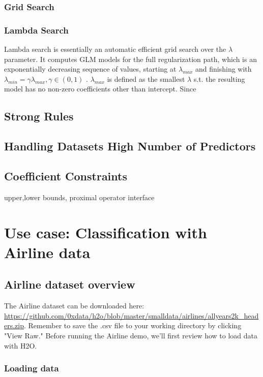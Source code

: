 \documentclass[11pt]{article}
\begin{document}
\subsubsection{Grid Search}
\subsubsection{Lambda Search}
Lambda search is essentially an automatic efficient grid search over the $\lambda$ parameter. It computes GLM models for the full regularization path, which is an exponentially decreasing sequence of values, starting at $\lambda_{max}$ and finishing with $\lambda_{min} = \gamma\lambda_{max}, \gamma \in (0,1)$ . $\lambda_{max}$ is defined as the smallest $\lambda$ s.t. the resulting model has no non-zero coefficients other than intercept. Since 



\subsection{Strong Rules}

\subsection{Handling Datasets High Number of Predictors}
\subsection{Coefficient Constraints}
upper,lower bounds, proximal operator interface

\section{Use case: Classification with Airline data}


\subsection{Airline dataset overview} 

The Airline dataset can be downloaded here: \url{https://github.com/0xdata/h2o/blob/master/smalldata/airlines/allyears2k_headers.zip}. Remember to save the .csv file to your working directory by clicking  "View Raw."  Before running the Airline demo, we'll first review how to load data with H2O. 

\subsubsection{Loading data} \label{2.5}
\end{document}
